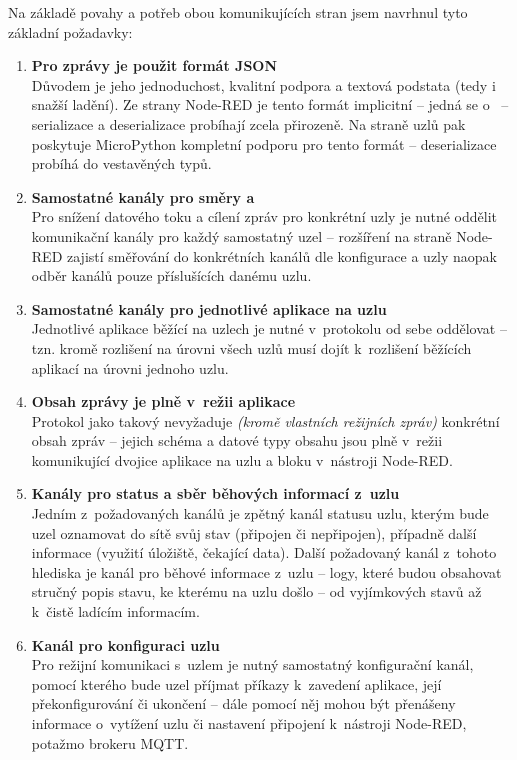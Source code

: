 Na základě povahy a potřeb obou komunikujících stran jsem navrhnul tyto základní požadavky:
\begin{enumerate}
    \item \textbf{Pro zprávy je použit formát JSON} \\
    Důvodem je jeho jednoduchost, kvalitní podpora a textová podstata (tedy i snažší ladění).
    Ze strany Node-RED je tento formát implicitní -- jedná se o~ -- serializace a
    deserializace probíhají zcela přirozeně.
    Na straně uzlů pak poskytuje MicroPython kompletní podporu pro tento formát -- deserializace probíhá do
    vestavěných typů.

    \item \textbf{Samostatné kanály pro směry  a } \\
    Pro snížení datového toku a cílení zpráv pro konkrétní uzly je nutné oddělit komunikační kanály pro každý
    samostatný uzel -- rozšíření na straně Node-RED zajistí směřování do konkrétních kanálů dle konfigurace a uzly
    naopak odběr kanálů pouze příslušících danému uzlu.

    \item \textbf{Samostatné kanály pro jednotlivé aplikace na uzlu} \\
    Jednotlivé aplikace běžící na uzlech je nutné v~protokolu od sebe oddělovat -- tzn. kromě rozlišení na úrovni
    všech uzlů musí dojít k~rozlišení běžících aplikací na úrovni jednoho uzlu.

    \item \textbf{Obsah zprávy je plně v~režii aplikace} \\
    Protokol jako takový nevyžaduje \emph{(kromě vlastních režijních zpráv)} konkrétní obsah zpráv -- jejich schéma a
    datové typy obsahu jsou plně v~režii komunikující dvojice aplikace na uzlu a bloku v~nástroji Node-RED.

    \item \textbf{Kanály pro status a sběr běhových informací z~uzlu} \\
    Jedním z~požadovaných kanálů je zpětný kanál statusu uzlu, kterým bude uzel oznamovat do sítě svůj stav (připojen či
    nepřipojen), případně další informace (využití úložiště, čekající data).
    Další požadovaný kanál z~tohoto hlediska je kanál pro běhové informace z~uzlu -- logy, které budou obsahovat
    stručný popis stavu, ke kterému na uzlu došlo -- od vyjímkových stavů až k~čistě ladícím informacím.

    \item \textbf{Kanál pro konfiguraci uzlu} \\
    Pro režijní komunikaci s~uzlem je nutný samostatný konfigurační kanál, pomocí kterého bude uzel příjmat příkazy
    k~zavedení aplikace, její překonfigurování či ukončení -- dále pomocí něj mohou být přenášeny informace o~vytížení
    uzlu či nastavení připojení k~nástroji Node-RED, potažmo brokeru MQTT.
\end{enumerate}

